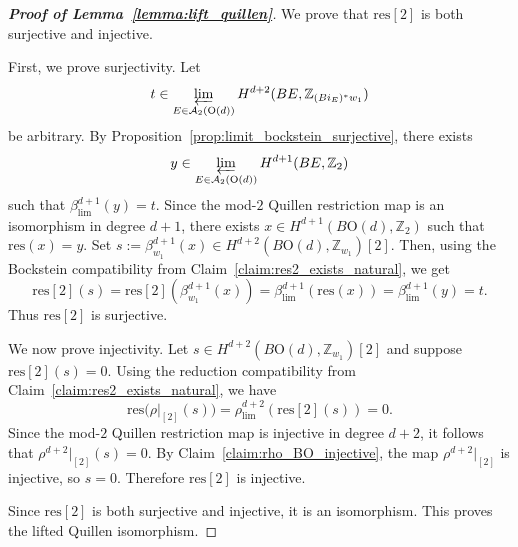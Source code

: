 \documentclass[aps,prx,reprint,superscriptaddress,twocolumn,amsmath,amssymb,amsfonts, nofootinbib]{revtex4-2}
\newcommand{\res}{\text{res}}
\theoremstyle{apsstyle}
\begin{document}
\begin{proof}[\textnormal{\textbf{Proof of Lemma~\ref{lemma:lift_quillen}}}]
We prove that $\res[2]$ is both surjective and injective.

\bigskip 

\noindent First, we prove surjectivity. Let
\begin{equation*}
t\in \varprojlim_{E\in\mathcal A_2(\mathrm{O}(d))}
H^{d+2}(BE,\mathbb Z_{(Bi_E)^*w_1})
\end{equation*}
be arbitrary. By Proposition~\ref{prop:limit_bockstein_surjective}, there exists
\begin{equation*}
y\in \varprojlim_{E\in\mathcal A_2(\mathrm{O}(d))}H^{d+1}(BE,\mathbb Z_2)
\end{equation*}
such that $\beta_{\lim}^{d+1}(y)=t$. Since the mod-$2$ Quillen restriction map is an isomorphism in degree $d+1$, there exists $x\in H^{d+1}(B\mathrm{O}(d),\mathbb Z_2)$ such that $\res(x)=y$. Set
$s:=\beta^{d+1}_{w_1}(x)\in H^{d+2}(B\mathrm{O}(d),\mathbb Z_{w_1})[2]$. Then, using the Bockstein compatibility from Claim~\ref{claim:res2_exists_natural}, we get
\begin{equation}
\res[2](s) = \res[2](\beta^{d+1}_{w_1}(x)) = \beta_{\lim}^{d+1}(\res(x)) = \beta_{\lim}^{d+1}(y) = t.
\end{equation}
Thus $\res[2]$ is surjective.

\bigskip 

\noindent We now prove injectivity. Let $s\in H^{d+2}(B\mathrm{O}(d),\mathbb Z_{w_1})[2]$ and suppose $\res[2](s)=0$. Using the reduction compatibility from Claim~\ref{claim:res2_exists_natural}, we have
\begin{equation}
\res\bigl(\rho\vert_{[2]}(s)\bigr) = \rho_{\lim}^{d+2}(\res[2](s)) = 0.
\end{equation}
Since the mod-$2$ Quillen restriction map is injective in degree $d+2$, it follows that $\rho^{d+2}\vert_{[2]}(s)=0$. By Claim~\ref{claim:rho_BO_injective}, the map $\rho^{d+2}\vert_{[2]}$ is injective, so $s=0$. Therefore $\res[2]$ is injective.

\noindent Since $\res[2]$ is both surjective and injective, it is an isomorphism. This proves the lifted Quillen isomorphism.
\end{proof}
\end{document}
